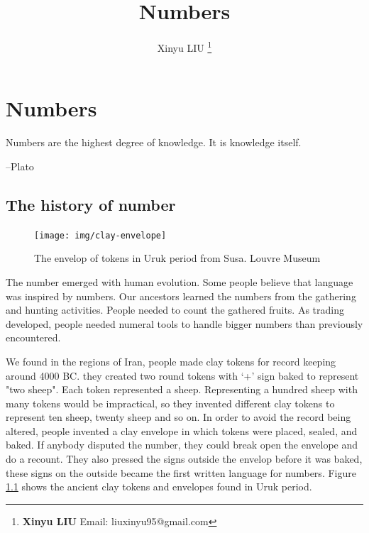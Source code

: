 \documentclass[b5paper]{article}
\begin{document}
\title{Numbers}

\author{Xinyu LIU
\thanks{{\bfseries Xinyu LIU} \newline
  Email: liuxinyu95@gmail.com \newline}
  }

\maketitle
\fi


\ifx\wholebook\relax
\chapter{Numbers}
\fi

\epigraph{Numbers are the highest degree of knowledge. It is knowledge itself.}{--Plato}

\section{The history of number}

\begin{figure}[htbp]
 \centering
 \texttt{[image: img/clay-envelope]}
 \caption{The envelop of tokens in Uruk period from Susa. Louvre Museum}
 \label{fig:clay-token}
\end{figure}

The number emerged with human evolution. Some people believe that language was inspired by numbers. Our ancestors learned the numbers from the gathering and hunting activities. People needed to count the gathered fruits. As trading developed, people needed numeral tools to handle bigger numbers than previously encountered.

We found in the regions of Iran, people made clay tokens for record keeping around 4000 BC. they created two round tokens with `+' sign baked to represent "two sheep". Each token represented a sheep. Representing a hundred sheep with many tokens would be impractical, so they invented different clay tokens to represent ten sheep, twenty sheep and so on. In order to avoid the record being altered, people invented a clay envelope in which tokens were placed, sealed, and baked. If anybody disputed the number, they could break open the envelope and do a recount. They also pressed the signs outside the envelop before it was baked, these signs on the outside became the first written language for numbers\cite{Calvin-Clawson-1994}. Figure \ref{fig:clay-token} shows the ancient clay tokens and envelopes found in Uruk period.
\end{document}
